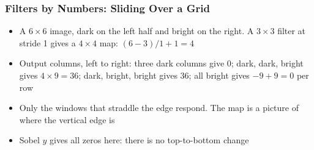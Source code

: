 \begin{frame}[fragile] \frametitle{Filters by Numbers: Sliding Over a Grid}
\begin{center}
\scriptsize
\setlength{\arraycolsep}{3pt}
\end{center}
\begin{itemize}
\item A $6 \times 6$ image, dark on the left half and bright on the right. A $3 \times 3$ filter at stride 1 gives a $4 \times 4$ map: $(6 - 3)/1 + 1 = 4$
\item Output columns, left to right: three dark columns give $0$; dark, dark, bright gives $4 \times 9 = 36$; dark, bright, bright gives $36$; all bright gives $-9 + 9 = 0$ per row
\item Only the windows that straddle the edge respond. The map is a picture of where the vertical edge is
\item Sobel $y$ gives all zeros here: there is no top-to-bottom change
\end{itemize}
\end{frame}

